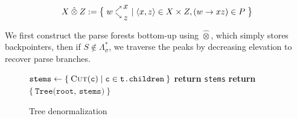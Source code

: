 \documentclass[sigplan,review,anonymous,acmsmall]{acmart}\settopmatter{printfolios=false,printccs=false,printacmref=false}
\begin{document}
\begin{align}
                  X\:\hat{\otimes}\:Z := \big\{\;w\hphantom{.}^{\nearrow}_{\searrow}\nobarfrac{x}{z} \mid \langle x, z\rangle \in X \times Z, (w\rightarrow xz) \in P\;\big\}
\end{align}

\noindent We first construct the parse forests bottom-up using $\hat{\otimes}$, which simply stores backpointers, then if $S \notin \Lambda^*_\sigma$, we traverse the peaks by decreasing elevation to recover parse branches.

\begin{figure}[H]
  \begin{minipage}{.45\linewidth}
    \begin{algorithm}[H]
      \caption{Tree denormalization}\label{alg:cap}
      \begin{algorithmic}
          \State $\texttt{stems} \leftarrow \{\:\textsc{Cut}(\texttt{c}) \mid \texttt{c} \in \texttt{t.children}\:\}$
            \State \textbf{return } \texttt{stems} %
          \Else%
            \State \textbf{return } $\{\:\texttt{Tree(root, stems)}\:\}$
          \EndIf
        \EndProcedure
      \end{algorithmic}
    \end{algorithm}
  \end{minipage}
\end{figure}
\end{document}
